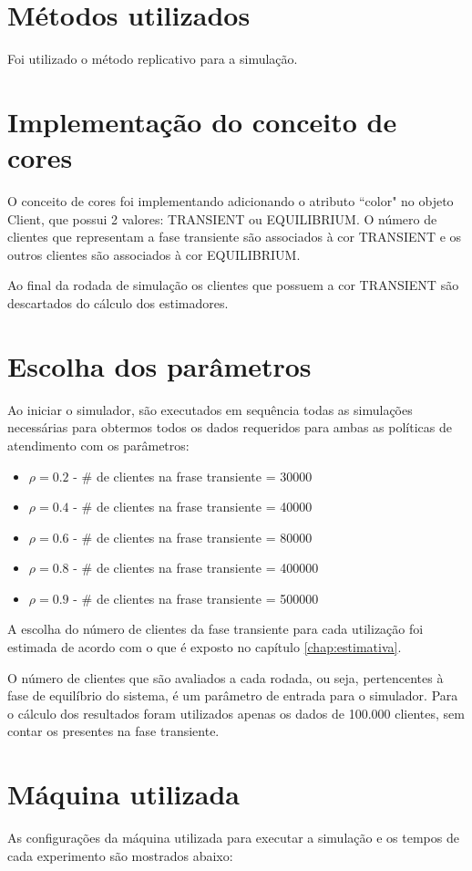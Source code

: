 \section{Métodos utilizados}
Foi utilizado o método replicativo para a simulação.

\section{Implementação do conceito de cores}
O conceito de cores foi implementando adicionando o atributo ``color" no objeto Client, que possui 2 valores: TRANSIENT ou EQUILIBRIUM.  O número de clientes que representam a fase transiente são associados à cor TRANSIENT e os outros clientes são associados à cor EQUILIBRIUM.

Ao final da rodada de simulação os clientes que possuem a cor TRANSIENT são descartados do cálculo dos estimadores.

\section{Escolha dos parâmetros}
\label{sec:parametros}
Ao iniciar o simulador, são executados em sequência todas as simulações necessárias para obtermos todos os dados requeridos para ambas as políticas de atendimento com os parâmetros:
\begin{itemize}
  \item $\rho=0.2$ - \# de clientes na frase transiente = 30000
  \item $\rho=0.4$ - \# de clientes na frase transiente = 40000
  \item $\rho=0.6$ - \# de clientes na frase transiente = 80000
  \item $\rho=0.8$ - \# de clientes na frase transiente = 400000
  \item $\rho=0.9$ - \# de clientes na frase transiente = 500000
\end{itemize}

A escolha do número de clientes da fase transiente para cada utilização foi estimada de acordo com o que é exposto no capítulo \ref{chap:estimativa}.

O número de clientes que são avaliados a cada rodada, ou seja, pertencentes à fase de equilíbrio do sistema, é um parâmetro de entrada para o simulador. Para o cálculo dos resultados foram utilizados apenas os dados de 100.000 clientes, sem contar os presentes na fase transiente.

\pagebreak
\section{Máquina utilizada}
As configurações da máquina utilizada para executar a simulação e os tempos de cada experimento são mostrados abaixo:\\

